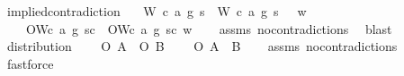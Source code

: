 \begin{isabellebody}
{}%
\endisatagproof
{\isafoldproof}%
%
\isadelimproof
\isanewline
%
\endisadelimproof
\isanewline
{}\isamarkupfalse%
\ implied{\isacharunderscore}contradiction{\isacharcolon}\isanewline
\ \ \ {\isachardoublequoteopen}{\isacharparenleft}{\isacharparenleft}{\isacharparenleft}W\ {\isacharparenleft}c{}{\isacharcomma}\ a{}{\isacharcomma}\ g{}{\isacharparenright}\ s{\isacharparenright}\ \isactrlbold {\isasymand}\ {\isacharparenleft}W\ {\isacharparenleft}c{}{\isacharcomma}\ a{}{\isacharcomma}\ g{}{\isacharparenright}\ s{\isacharparenright}{\isacharparenright}\ \isactrlbold {\isasymrightarrow}\ \isactrlbold {\isasymbottom}{\isacharparenright}\ w{\isachardoublequoteclose}\isanewline
\ \ \ {\isachardoublequoteopen}\isactrlbold {\isasymnot}\ {\isacharparenleft}O{\isacharbraceleft}W{\isacharparenleft}c{}{\isacharcomma}\ a{}{\isacharcomma}\ g{}{\isacharparenright}\ s{\isacharbar}c{\isacharbraceright}\ \isactrlbold {\isasymand}\ O{\isacharbraceleft}W{\isacharparenleft}c{}{\isacharcomma}\ a{}{\isacharcomma}\ g{}{\isacharparenright}\ s{\isacharbar}c{\isacharbraceright}{\isacharparenright}\ w{\isachardoublequoteclose}\isanewline
%
\isadelimproof
\ \ %
\endisadelimproof
%
\isatagproof
{}\isamarkupfalse%
\ assms\ no{\isacharunderscore}contradictions\ \isamarkupfalse%
\ blast\isanewline
%
%
\endisatagproof
{\isafoldproof}%
%
\isadelimproof
\isanewline
%
\endisadelimproof
\isanewline
{}\isamarkupfalse%
\ distribution{\isacharcolon}\isanewline
\ \ \ {\isachardoublequoteopen}{\isasymTurnstile}\ {\isacharparenleft}O\ {\isacharbraceleft}A{\isacharbraceright}\ \isactrlbold {\isasymand}\ O\ {\isacharbraceleft}B{\isacharbraceright}{\isacharparenright}{\isachardoublequoteclose}\isanewline
\ \ \ {\isachardoublequoteopen}{\isasymTurnstile}\ O\ {\isacharbraceleft}A\ \isactrlbold {\isasymand}\ B{\isacharbraceright}{\isachardoublequoteclose}\isanewline
%
\isadelimproof
\ \ %
\endisadelimproof
%
\isatagproof
{}\isamarkupfalse%
\ assms\ no{\isacharunderscore}contradictions\ \isamarkupfalse%
\ fastforce%
\endisatagproof
{\isafoldproof}%
%
\isadelimproof
%
\endisadelimproof
%
\begin{isamarkuptext}%

\end{isamarkuptext}
\end{isabellebody}
